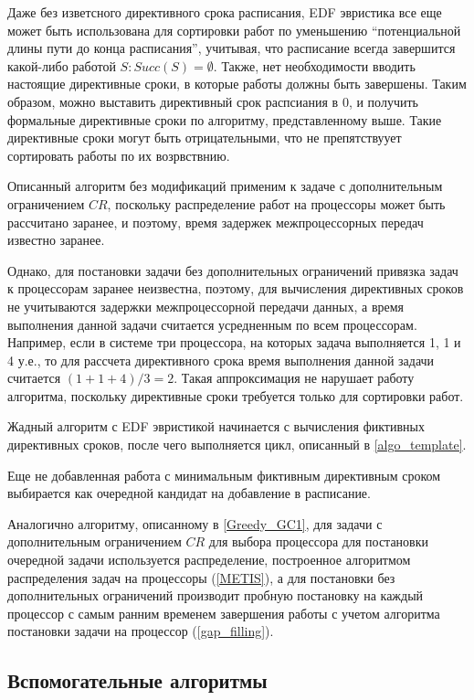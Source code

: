 Даже без изветсного директивного срока расписания, EDF эвристика все еще может быть использована для сортировки работ по уменьшению ``потенциальной длины пути  до конца расписания'', учитывая, что расписание всегда завершится какой-либо работой $S : Succ(S) = \emptyset$. Также, нет необходимости вводить настоящие директивные сроки, в которые работы должны быть завершены. Таким образом, можно выставить директивный срок распсиания в $0$, и получить формальные директивные сроки по алгоритму, представленному выше. Такие директивные сроки могут быть отрицательными, что не препятствуует сортировать работы по их возрвствнию.

Описанный алгоритм без модификаций применим к задаче с дополнительным ограничением $CR$, поскольку распределение работ на процессоры может быть рассчитано заранее, и поэтому, время задержек межпроцессорных передач известно заранее. 

Однако, для постановки задачи без дополнительных ограничений привязка задач к процессорам заранее неизвестна, поэтому, для вычисления директивных сроков не учитываются задержки межпроцессорной передачи данных, а время выполнения данной задачи считается усредненным по всем процессорам. Например, если в системе три процессора, на которых задача выполняется 1, 1 и 4 у.е., то для рассчета директивного срока время выполнения данной задачи считается $(1+1+4)/3 = 2$. Такая аппроксимация не нарушает работу алгоритма, поскольку директивные сроки требуется только для сортировки работ.

Жадный алгоритм с EDF эвристикой начинается с вычисления фиктивных директивных сроков, после чего выполняется цикл, описанный в \ref{algo_template}.

Еще не добавленная работа с минимальным фиктивным директивным сроком выбирается как очередной кандидат на добавление в расписание. 

Аналогично алгоритму, описанному в \ref{Greedy_GC1}, для задачи с дополнительным ограничением $CR$ для выбора процессора для постановки очередной задачи используется распределение, построенное алгоритмом распределения задач на процессоры (\ref{METIS}), а для постановки без дополнительных ограничений производит пробную постановку на каждый процессор с самым ранним временем завершения работы с учетом алгоритма постановки задачи на процессор (\ref{gap_filling}).

\subsection{Вспомогательные алгоритмы}
